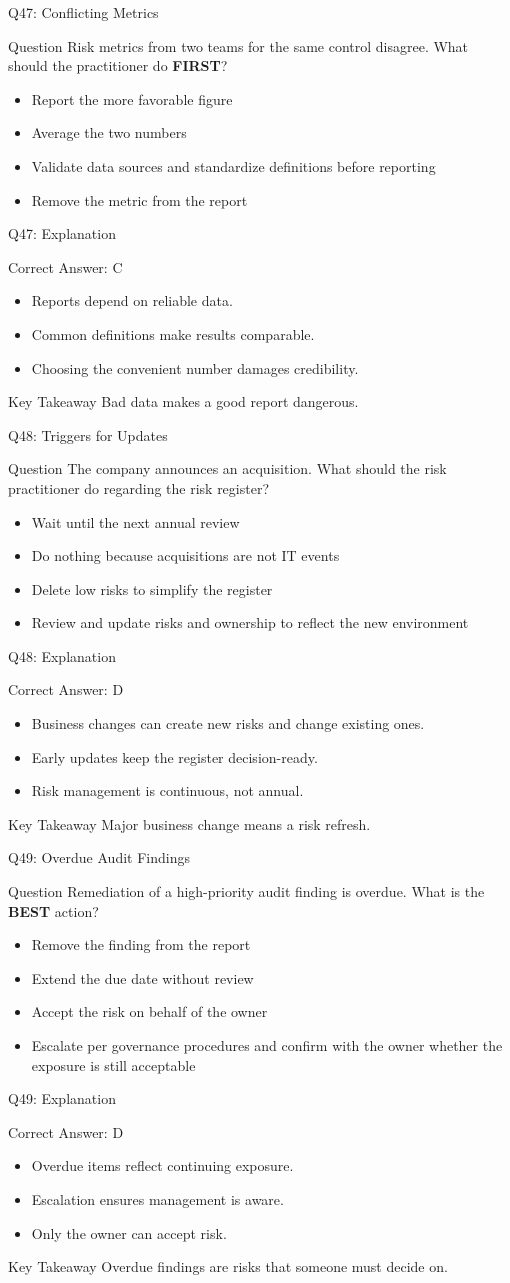 \documentclass[aspectratio=169]{beamer}
\newcommand{\hq}[7]{%
	\begin{frame}{Q#1: #2}
		\begin{block}{Question}
			#3
		\end{block}
		\begin{itemize}
			#4
		\end{itemize}
	\end{frame}
	\begin{frame}{Q#1: Explanation}
		\begin{block}{Correct Answer: #5}
			\begin{itemize}
				#6
			\end{itemize}
		\end{block}
		\begin{alertblock}{Key Takeaway}
			#7
		\end{alertblock}
	\end{frame}
}
\begin{document}
	\hq{47}{Conflicting Metrics}
	{Risk metrics from two teams for the same control disagree. What should the practitioner do \textbf{FIRST}?}
	{\item[\textbf{(A)}] Report the more favorable figure
		\item[\textbf{(B)}] Average the two numbers
		\item[\textbf{(C)}] Validate data sources and standardize definitions before reporting
		\item[\textbf{(D)}] Remove the metric from the report}
	{C}
	{\item Reports depend on reliable data.
		\item Common definitions make results comparable.
		\item Choosing the convenient number damages credibility.}
	{Bad data makes a good report dangerous.}
	
	\hq{48}{Triggers for Updates}
	{The company announces an acquisition. What should the risk practitioner do regarding the risk register?}
	{\item[\textbf{(A)}] Wait until the next annual review
		\item[\textbf{(B)}] Do nothing because acquisitions are not IT events
		\item[\textbf{(C)}] Delete low risks to simplify the register
		\item[\textbf{(D)}] Review and update risks and ownership to reflect the new environment}
	{D}
	{\item Business changes can create new risks and change existing ones.
		\item Early updates keep the register decision-ready.
		\item Risk management is continuous, not annual.}
	{Major business change means a risk refresh.}
	
	\hq{49}{Overdue Audit Findings}
	{Remediation of a high-priority audit finding is overdue. What is the \textbf{BEST} action?}
	{\item[\textbf{(A)}] Remove the finding from the report
		\item[\textbf{(B)}] Extend the due date without review
		\item[\textbf{(C)}] Accept the risk on behalf of the owner
		\item[\textbf{(D)}] Escalate per governance procedures and confirm with the owner whether the exposure is still acceptable}
	{D}
	{\item Overdue items reflect continuing exposure.
		\item Escalation ensures management is aware.
		\item Only the owner can accept risk.}
	{Overdue findings are risks that someone must decide on.}
	
\end{document}
